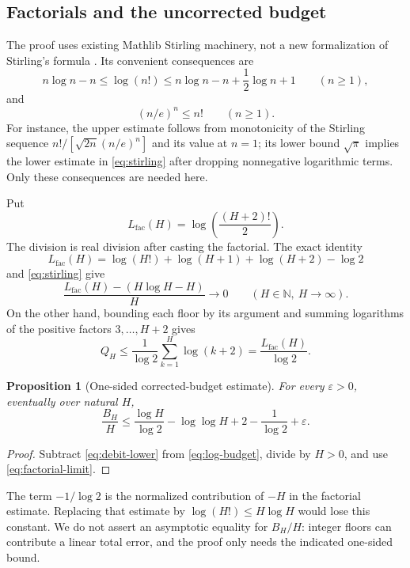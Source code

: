 \documentclass[11pt,a4paper]{article}
\newtheorem{proposition}[theorem]{Proposition}
\theoremstyle{definition}
\theoremstyle{remark}
\numberwithin{equation}{section}
\newcommand{\N}{\mathbb N}
\begin{document}
\subsection{Factorials and the uncorrected budget}
The proof uses existing Mathlib Stirling machinery, not a new formalization of
Stirling's formula \citep{MathlibPin}. Its convenient consequences are
\begin{equation}\label{eq:stirling}
 n\log n-n\le\log(n!)
 \le n\log n-n+\frac12\log n+1\qquad(n\ge1),
\end{equation}
and
\begin{equation}\label{eq:factorial-lower}
 (n/e)^n\le n!\qquad(n\ge1).
\end{equation}
For instance, the upper estimate follows from monotonicity of the Stirling
sequence $n!/[\sqrt{2n}(n/e)^n]$ and its value at $n=1$; its lower bound
$\sqrt\pi$ implies the lower estimate in \eqref{eq:stirling} after dropping
nonnegative logarithmic terms. Only these consequences are needed here.

Put
\[
 L_{\mathrm{fac}}(H)=\log\left(\frac{(H+2)!}{2}\right).
\]
The division is real division after casting the factorial. The exact identity
\begin{equation}\label{eq:factorial-shift}
 L_{\mathrm{fac}}(H)=\log(H!)+\log(H+1)+\log(H+2)-\log2
\end{equation}
and \eqref{eq:stirling} give
\begin{equation}\label{eq:factorial-limit}
 \frac{L_{\mathrm{fac}}(H)-(H\log H-H)}{H}\longrightarrow0
 \qquad(H\in\N,\ H\to\infty).
\end{equation}
On the other hand, bounding each floor by its argument and summing logarithms
of the positive factors $3,\ldots,H+2$ gives
\begin{equation}\label{eq:log-budget}
 Q_H\le\frac1{\log2}\sum_{k=1}^H\log(k+2)
      =\frac{L_{\mathrm{fac}}(H)}{\log2}.
\end{equation}

\begin{proposition}[One-sided corrected-budget estimate]\label{prop:budget-upper}
For every $\varepsilon>0$, eventually over natural $H$,
\begin{equation}\label{eq:budget-upper}
 \frac{B_H}{H}\le
 \frac{\log H}{\log2}-\log\log H+2-\frac1{\log2}+\varepsilon.
\end{equation}
\end{proposition}
\begin{proof}
Subtract \eqref{eq:debit-lower} from \eqref{eq:log-budget}, divide by $H>0$,
and use \eqref{eq:factorial-limit}.
\end{proof}
The term $-1/\log2$ is the normalized contribution of $-H$ in the factorial
estimate. Replacing that estimate by $\log(H!)\le H\log H$ would lose this
constant. We do not assert an asymptotic equality for $B_H/H$: integer floors
can contribute a linear total error, and the proof only needs the indicated
one-sided bound.
\end{document}
